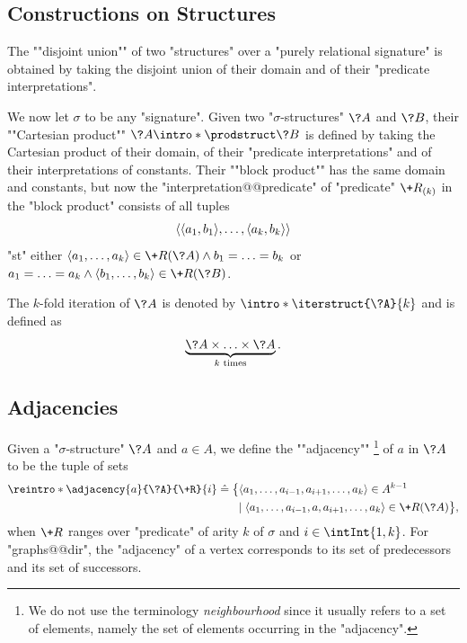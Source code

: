 \subsection{Constructions on Structures}

The \AP""disjoint union"" of two "structures" over a
"purely relational signature" 
is obtained by taking the disjoint union of their domain and of
their "predicate interpretations".

We now let $\sigma$ to be any "signature".
Given two "$\sigma$-structures" $\?A$ and $\?B$, their
""Cartesian product"" \AP$\?A \intro*\prodstruct \?B$
is defined by taking the Cartesian product of their domain, of
their "predicate interpretations" and of their interpretations of constants. 
Their ""block product"" has the same domain and constants,
but now the "interpretation@@predicate" of "predicate" $\+R_{(k)}$
in the "block product" consists of all tuples
\[\langle\langle a_1,b_1\rangle, \dotsc, \langle a_k,b_k\rangle\rangle\] 
"st" either $\tup{a_1, \dotsc, a_k} \in \+R(\?A)
\land b_1 = \dotsc = b_k$ or 
$a_1 = \dotsc = a_k
\land \tup{b_1, \dotsc, b_k} \in \+R(\?B)$.

The $k$-fold iteration of $\?A$ is denoted by
$\intro*\iterstruct{\?A}{k}$ and is defined as
\[
	\underbrace{\?A \times \dotsc \times \?A}_{k \text{ times}}.
\]

\subsection{Adjacencies}

Given a "$\sigma$-structure" $\?A$ and $a \in A$, we define the \AP""adjacency""%
\footnote{We do not use the terminology \emph{neighbourhood} since it usually refers
to a set of elements, namely the set of elements occurring in the "adjacency".}
of $a$ in $\?A$ to be the tuple of sets%
\AP{}
\begin{align*}
	\reintro*\adjacency{a}{\?A}{\+R}{i} & \defeq
		\big\{
			\langle a_1, \dotsc, a_{i-1}, a_{i+1}, \dotsc, a_k \rangle \in A^{k-1}
			\\ & \hphantom{\defeq \big\{ }\mid
			\langle a_1, \dotsc, a_{i-1}, a, a_{i+1}, \dotsc, a_k \rangle \in \+R(\?A)
		\big\},
\end{align*}
when $\+R$ ranges over "predicate" of arity $k$ of $\sigma$ and $i \in \intInt{1,k}$. 
For "graphs@@dir", the "adjacency" of a vertex corresponds to its set of predecessors and
its set of successors.


